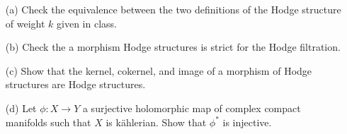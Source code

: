 \documentclass[12pt]{article}
\begin{document}


\begin{problem}{1}
    \begin{enumerate}
        \item[(a)] Check the equivalence between the two definitions of the Hodge structure of weight $k$ given in class. 
        \item[(b)] Check the a morphism Hodge structures is strict for the Hodge filtration. 
        \item[(c)] Show that the kernel, cokernel, and image of a morphism of Hodge structures are Hodge structures.
        \item[(d)] Let $\phi: X \to Y$ a surjective holomorphic map of complex compact manifolds such that $X$ is k\"ahlerian. Show that $\phi^*$ is injective.
    \end{enumerate}
\end{problem}
\end{document}
